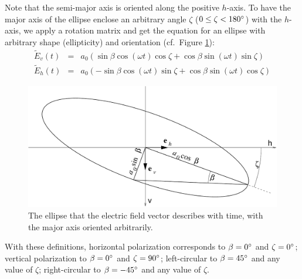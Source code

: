 Note that the semi-major axis is oriented along the positive $h$-axis.
To have the major axis of the ellipse enclose an arbitrary angle
$\zeta$ ($0 \leq \zeta < 180^\circ$) with the $h$-axis, we apply a
rotation matrix and get the equation for an ellipse with arbitrary
shape (ellipticity) and orientation (cf.\
Figure \ref{fig:polarization:ellipse_arbitrary})\label{def:orientation-angle}:
\begin{eqnarray}
  \label{eq:polarization:ellipse_rotated1}
 \tilde{E}_v (t) &=&  a_0(  \sin\beta \cos(\omega t) \cos\zeta
                           +\cos\beta \sin(\omega t) \sin\zeta )\\
  \label{eq:polarization:ellipse_rotated2}
 \tilde{E}_h (t) &=&  a_0( -\sin\beta \cos(\omega t) \sin\zeta
                           +\cos\beta \sin(\omega t) \cos\zeta )
\end{eqnarray}
%
\begin{figure}
 \begin{center}
  \begin{minipage}[c]{0.9\textwidth}
   \begin{center}
    \includegraphics*[width=0.9\hsize]{pol_ellipse_arbitrary}
   \end{center}
  \end{minipage}
  \begin{minipage}[c]{0.9\textwidth}
   \caption{The ellipse that the electric field vector describes with
     time, with the major axis oriented arbitrarily.}
   \label{fig:polarization:ellipse_arbitrary}
  \end{minipage}
 \end{center}
\end{figure}   
With these definitions, horizontal polarization corresponds to
$\beta=0^\circ$ and $\zeta=0^\circ$; vertical polarization to 
$\beta=0^\circ$ and $\zeta=90^\circ$; left-circular to 
$\beta=45^\circ$ and any value of $\zeta$; right-circular to 
$\beta=-45^\circ$ and any value of $\zeta$.
    
